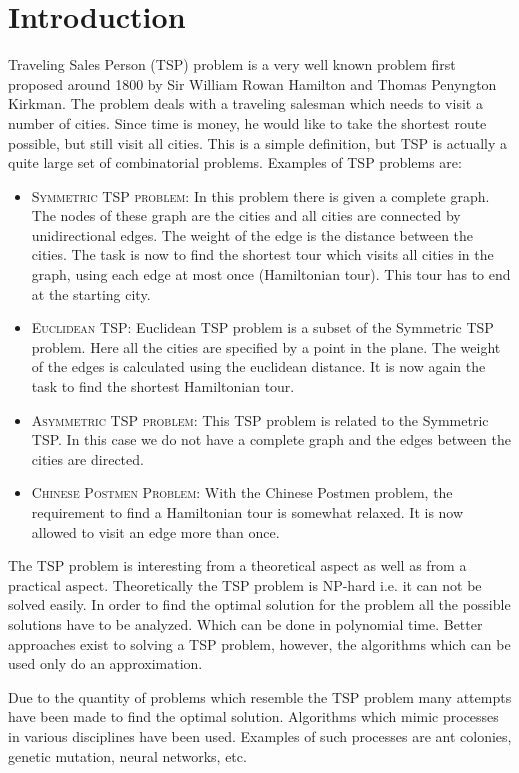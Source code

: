 \section{Introduction}
 Traveling Sales Person (TSP) problem is a very well known
problem first proposed around 1800 by Sir William Rowan Hamilton and Thomas
Penyngton Kirkman. The problem deals with a traveling salesman which needs to
visit a number of cities. Since time is money, he would like to take the
shortest route possible, but still visit all cities. This is a simple
definition, but TSP is actually a quite large set of combinatorial problems.
Examples of TSP problems are:
\begin{itemize}
\item \textsc{Symmetric TSP problem:}  In this problem there is given a complete graph.
The nodes of these graph are the cities and all cities are connected by
unidirectional edges. The weight of the edge is the distance between the cities.
The task is now to find the shortest tour which visits all cities in the graph,
using each edge at most once (Hamiltonian tour). This tour has to end at the
starting city.
\item \textsc{Euclidean TSP:}  Euclidean TSP problem is a subset of the
Symmetric TSP problem.  Here all the cities are specified by a point in the
plane. The weight of the edges is calculated using the euclidean distance. It
is now again the task to find the shortest Hamiltonian tour.
\item \textsc{Asymmetric TSP problem:} This TSP problem is related to the
Symmetric TSP. In this case we do not have a complete graph and the edges
between the cities are directed.
\item \textsc{Chinese Postmen Problem:} With the Chinese Postmen problem,  the
requirement to find a Hamiltonian tour is somewhat relaxed. It is now allowed
to visit an edge more than once.
\end{itemize}

The TSP problem is interesting from a theoretical aspect as well as from a
practical aspect. Theoretically the TSP problem is NP-hard i.e. it can not be
solved easily. In order to find the optimal solution for the problem all the
possible solutions have to be analyzed. Which can be done in polynomial time.
Better approaches exist to solving a TSP problem, however, the algorithms
which can be used only do an approximation.

Due to the quantity of problems which resemble the TSP problem many attempts
have been made to find the optimal solution. Algorithms which mimic processes
in various disciplines have been used. Examples of such processes are ant
colonies, genetic mutation, neural networks, etc. 

